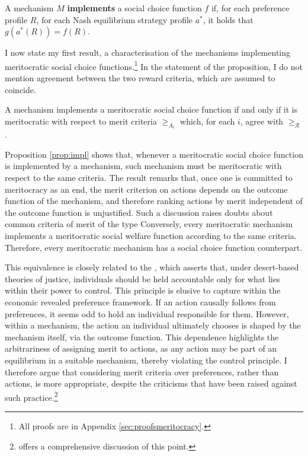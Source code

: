 \begin{definition}
	A mechanism \( M \) \textbf{implements} a social choice function \( f \) if, for each preference profile \( R \), for each Nash equilibrium strategy profile \( a^{*} \), it holds that \( g( a^{*} ( R ) ) = f ( R ) \).
\end{definition}

I now state my first result, a characterisation of the mechanisms implementing meritocratic social choice functions.\footnote{All proofs are in Appendix \ref{sec:proofsmeritocracy}.} In the statement of the proposition, I do not mention agreement between the two reward criteria, which are assumed to coincide.

\begin{prop}\label{prop:impl}
	A mechanism implements a meritocratic social choice function if and only if it is meritocratic with respect to merit criteria \( \geq_{A_i} \) which, for each \( i \), agree with \( \geq_{\mathcal{R}} \).
\end{prop}

Proposition \ref{prop:impl} shows that, whenever a meritocratic social choice function is implemented by a mechanism, such mechanism must be meritocratic with respect to the same criteria. The result remarks that, once one is committed to meritocracy as an end, the merit criterion on actions depends on the outcome function of the mechanism, and therefore ranking actions by merit independent of the outcome function is unjustified. Such a discussion raises doubts about common criteria of merit of the type  Conversely, every meritocratic mechanism implements a meritocratic social welfare function according to the same criteria. Therefore, every meritocratic mechanism has a social choice function counterpart.

This equivalence is closely related to the  \citep{arnesonDesertEquality2007,fleurbaeyFairnessResponsibilityWelfare2008}, which asserts that, under desert-based theories of justice, individuals should be held accountable only for what lies within their power to control. This principle is elusive to capture within the economic revealed preference framework. If an action causally follows from preferences, it seems odd to hold an individual responsible for them. However, within a mechanism, the action an individual ultimately chooses is shaped by the mechanism itself, via the outcome function. This dependence highlights the arbitrariness of assigning merit to actions, as any action may be part of an equilibrium in a suitable mechanism, thereby violating the control principle. I therefore argue that considering merit criteria over preferences, rather than actions, is more appropriate, despite the criticisms that have been raised against such practice.\footnote{\citet[ch. 10]{fleurbaeyFairnessResponsibilityWelfare2008} offers a comprehensive discussion of this point.}


